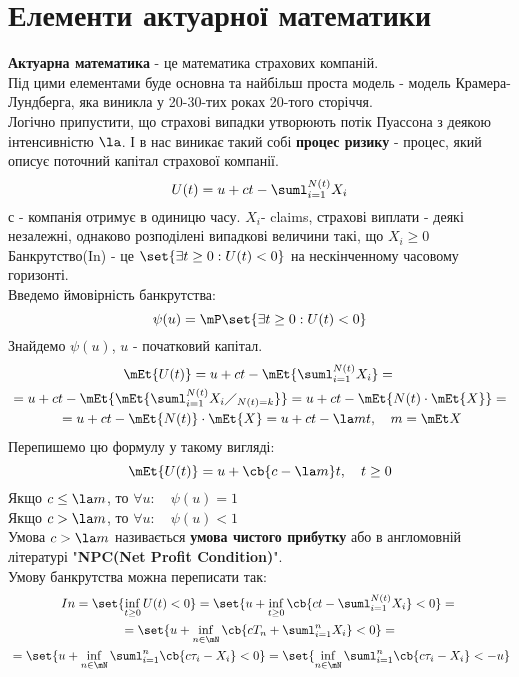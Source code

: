 \section{Елементи актуарної математики}
\textbf{Актуарна математика} - це математика страхових компаній. \\
Під цими елементами буде основна та найбільш проста модель - модель Крамера-Лундберга, яка виникла у 20-30-тих роках 20-того сторіччя.\\
Логічно припустити, що страхові випадки утворюють потік Пуассона з деякою інтенсивністю $\la$. І в нас виникає такий собі \textbf{процес ризику} - процес, який описує поточний капітал страхової компанії.
\begin{equation}
	U(t) = u + ct - \suml_{i=1}^{N(t)} X_i
\end{equation}
с - компанія отримує в одиницю часу. $X_i$- claims, страхові виплати - деякі незалежні, однаково розподілені випадкові величини такі, що $X_i \geq 0$\\
Банкрутство(In) - це $\set{\exists t\geq 0: U(t)<0}$ на нескінченному часовому горизонті. \\
Введемо ймовірність банкрутства:
\begin{equation}
	\psi(u)= \mP\set{\exists t\geq 0: U(t)<0}
\end{equation}
Знайдемо $\psi(u)$, $u$ - початковий капітал.
\begin{multline}
	\mEt{U(t)} = u + ct - \mEt{\suml_{i=1}^{N(t)} X_i} = {}\\{}= u + ct - \mEt{\mEt{\suml_{i=1}^{N(t)}  X_i\diagup_{N(t)=k}}}  = u + ct - \mEt{N(t)\cdot \mEt{X}}  ={}\\{}= u + ct - \mEt{N(t)}\cdot \mEt{X} = u + ct - \la m t, \quad m = \mEt X 
\end{multline}
Перепишемо цю формулу у такому вигляді:
\begin{equation}
	\mEt{U(t)} = u + \cb{c-\la m}t,\quad t\geq 0
\end{equation}
Якщо $c\leq\la m$, то $\forall u:\quad\psi(u)=1$\\
Якщо $c>\la m$, то $\forall u:\quad\psi(u)<1$\\
Умова $c>\la m$ називається \textbf{умова чистого прибутку} або в англомовній літературі "\textbf{NPC(Net Profit Condition)}".\\
Умову банкрутства можна переписати так:
\begin{multline}
In = \set{\inf\limits_{t\geq 0} U(t)<0} = \set{u + \inf\limits_{t\geq 0} \cb{ct - \suml_{i=1}^{N(t)} X_i} < 0 } ={} \\ {} =  \set{u + \inf\limits_{n\in \mN} \cb{c T_n + \suml_{i=1}^n X_i } < 0 }  = {} \\ {}= \set{u +\inf\limits_{n\in\mN} \suml_{i=1}^n \cb{c\tau_i - X_i}<0} = \set{\inf\limits_{n\in\mN} \suml_{i=1}^n \cb{c\tau_i - X_i} < - u}
\end{multline}
